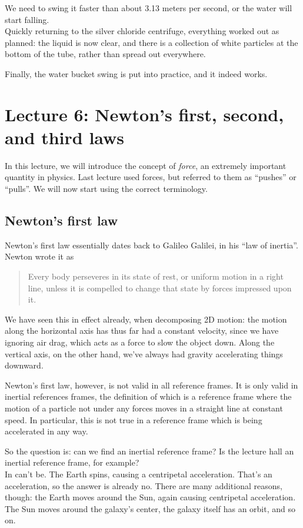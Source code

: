 \documentclass[8.01x]{subfiles}
\begin{document}
We need to swing it faster than about 3.13 meters per second, or the water will start falling.\\
Quickly returning to the silver chloride centrifuge, everything worked out as planned: the liquid is now clear, and there is a collection of white particles at the bottom of the tube, rather than spread out everywhere.

Finally, the water bucket swing is put into practice, and it indeed works.

\section{Lecture 6: Newton's first, second, and third laws}

In this lecture, we will introduce the concept of \emph{force}, an extremely important quantity in physics. Last lecture used forces, but referred to them as ``pushes'' or ``pulls''. We will now start using the correct terminology.

\subsection{Newton's first law}

Newton's first law essentially dates back to Galileo Galilei, in his ``law of inertia''.\\
Newton wrote it as

\begin{quote}
Every body perseveres in its state of rest, or uniform motion in a right line, unless it is compelled to change that state by forces impressed upon it.
\end{quote}

We have seen this in effect already, when decomposing 2D motion: the motion along the horizontal axis has thus far had a constant velocity, since we have ignoring air drag, which acts as a force to slow the object down. Along the vertical axis, on the other hand, we've always had gravity accelerating things downward.

Newton's first law, however, is not valid in all reference frames. It is only valid in inertial references frames, the definition of which is a reference frame where the motion of a particle not under any forces moves in a straight line at constant speed. In particular, this is not true in a reference frame which is being accelerated in any way.

So the question is: can we find an inertial reference frame? Is the lecture hall an inertial reference frame, for example?\\
In can't be. The Earth spins, causing a centripetal acceleration. That's an acceleration, so the answer is already no. There are many additional reasons, though: the Earth moves around the Sun, again causing centripetal acceleration. The Sun moves around the galaxy's center, the galaxy itself has an orbit, and so on.
\end{document}
